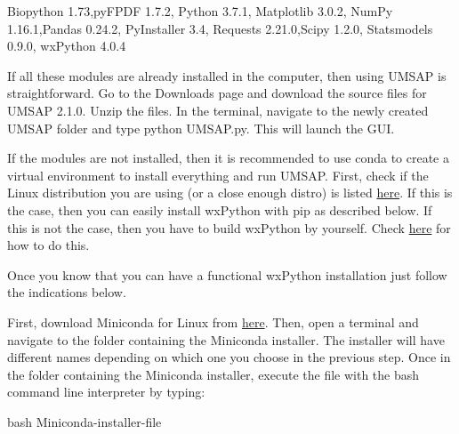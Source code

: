 Biopython \num{1.73},\newline pyFPDF \num[parse-numbers=false]{1.7.2}, \newline Python \num[parse-numbers=false]{3.7.1}, \newline Matplotlib \num[parse-numbers=false]{3.0.2}, \newline NumPy \num[parse-numbers=false]{1.16.1},\newline Pandas \num[parse-numbers=false]{0.24.2}, \newline PyInstaller \num[parse-numbers=false]{3.4}, \newline Requests \num[parse-numbers=false]{2.21.0},\newline Scipy \num[parse-numbers=false]{1.2.0}, \newline Statsmodels \num[parse-numbers=false]{0.9.0}, \newline wxPython \num[parse-numbers=false]{4.0.4}

If all these modules are already installed in the computer, then using UMSAP is straightforward. Go to the Downloads page and download the source files for UMSAP \num[parse-numbers=false]{2.1.0}.  Unzip the files. In the terminal, navigate to the newly created UMSAP folder and type python UMSAP.py. This will launch the GUI.

If the modules are not installed, then it is recommended to use conda to create a virtual environment to install everything and run UMSAP. First, check if the Linux distribution you are using (or a close enough distro) is listed \href{https://extras.wxpython.org/wxPython4/extras/linux/}{here}. If this is the case, then you can easily install wxPython with pip as described below. If this is not the case, then you have to build wxPython by yourself. Check \href{https://wxpython.org/blog/2017-08-17-builds-for-linux-with-pip/index.html}{here} for how to do this.

Once you know that you can have a functional wxPython installation just follow the indications below.

First, download Miniconda for Linux from \href{https://docs.conda.io/en/latest/miniconda.html}{here}. Then, open a terminal and navigate to the folder containing the Miniconda installer. The installer will have different names depending on which one you choose in the previous step. Once in the folder containing the Miniconda installer, execute the file with the bash command line interpreter by typing:

bash Miniconda-installer-file

